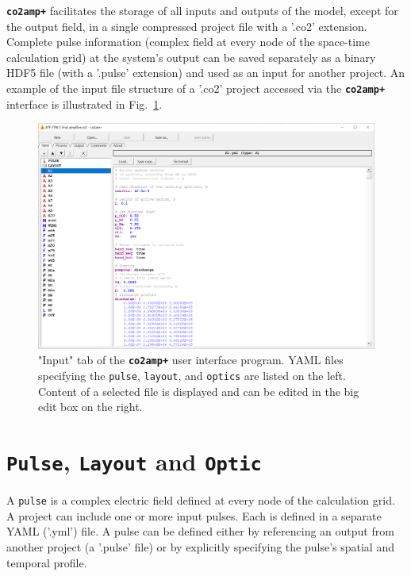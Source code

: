 \textbf{\texttt{co2amp+}} facilitates the storage of all inputs and outputs of the model, except for the output field, in a single compressed project file with a '.co2' extension. Complete pulse information (complex field at every node of the space-time calculation grid) at the system's output can be saved separately as a binary HDF5 file (with a '.pulse' extension) and used as an input for another project. An example of the input file structure of a '.co2' project accessed via the \textbf{\texttt{co2amp+}} interface is illustrated in Fig.~\ref{fig:gui-input}.

\begin{figure}[ht]
 \centering
 \includegraphics[width=14cm]{images/gui-input}
 \caption{"Input" tab of the \textbf{\texttt{co2amp+}} user interface program. YAML files specifying the \texttt{pulse}, \texttt{layout}, and \texttt{optics} are listed on the left. Content of a selected file is displayed and can be edited in the big edit box on the right.}
 \label{fig:gui-input}
\end{figure}


\section{\texttt{Pulse}, \texttt{Layout} and \texttt{Optic}}
A \texttt{pulse} is a complex electric field defined at every node of the calculation grid. A project can include one or more input pulses. Each is defined in a separate YAML ('.yml') file. A pulse can be defined either by referencing an output from another project (a '.pulse' file) or by explicitly specifying the pulse's spatial and temporal profile.


